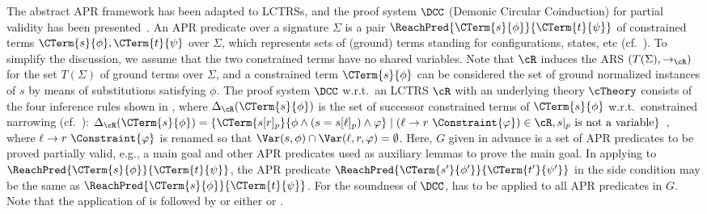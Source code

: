 The abstract APR framework has been adapted to LCTRSs, and the proof system $\DCC$ (Demonic Circular Coinduction) for partial validity has been presented~\cite{CL18}.
An APR predicate over a signature $\Sigma$ is a pair $\ReachPred{\CTerm{s}{\phi}}{\CTerm{t}{\psi}}$ of constrained terms $\CTerm{s}{\phi},\CTerm{t}{\psi}$ over $\Sigma$, which represents sets of (ground) terms standing for configurations, states, etc (cf.~\cite{FKN17tocl,KN18eptcs,KN23padl}).
To simplify the discussion, we assume that the two constrained terms have no shared variables.
Note that $\cR$ induces the ARS $(T(\Sigma),\to_\cR)$ for the set $T(\Sigma)$ of ground terms over $\Sigma$, and a constrained term $\CTerm{s}{\phi}$ can be considered the set of ground normalized instances of $s$ by means of substitutions satisfying $\phi$.
The proof system $\DCC$ w.r.t.\ an LCTRS $\cR$ with an underlying theory $\cTheory$ consists of the four inference rules shown in , where $\Delta_\cR(\CTerm{s}{\phi})$ is the set of successor constrained terms of $\CTerm{s}{\phi}$ w.r.t.\ constrained narrowing (cf.~\cite[Lemma~3.5]{KN24jip}):
$\Delta_\cR(\CTerm{s}{\phi}) = \{ \CTerm{s[r]_p}{\phi \land (s = s[\ell]_p) \land \varphi} \mid (\ell \to r ~\Constraint{\varphi}) \in \cR, \mbox{$s|_p$ is not a variable} \}$~\cite[Definition~11]{CL18},
where $\ell \to r ~\Constraint{\varphi}$ is renamed so that $\Var(s,\phi) \cap \Var(\ell,r,\varphi) = \emptyset$.
Here, $G$ given in advance is a set of APR predicates to be proved partially valid, e.g., a main goal and other APR predicates used as auxiliary lemmas to prove the main goal.
In applying  to $\ReachPred{\CTerm{s}{\phi}}{\CTerm{t}{\psi}}$,
the APR predicate $\ReachPred{\CTerm{s'}{\phi'}}{\CTerm{t'}{\psi'}}$ in the side condition may be the same as $\ReachPred{\CTerm{s}{\phi}}{\CTerm{t}{\psi}}$.
For the soundness of $\DCC$,  has to be applied to all APR predicates in $G$. Note that the application of  is followed by  or either  or .

